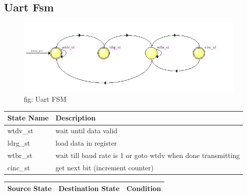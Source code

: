 \documentclass[12pt,a4 paper] {report}
\begin{document}
\newpage

\subsection{Uart Fsm}
\begin{figure}[h]
	\centering	
	\includegraphics[scale=0.5]{../png/Uart.png}
	\newline
	fig: Uart FSM\\
\end{figure}
\begin{center}
 \begin{tabular}{| p{4cm} | p{7cm} |}
	 \hline
	 \textbf{State Name} & \textbf{Description} \\
	 \hline
	 wtdv\_st & wait until data valid \\
	 \hline
	 ldrg\_st & load data in register \\
	 \hline
	 wtbr\_st & wait till baud rate is 1 or goto wtdv when done transmitting \\
	 \hline
	 cinc\_st & get next bit (increment counter) \\
	 \hline
 \end{tabular}
\end{center}
\begin{center}
	\begin{tabular}{| p{2cm} | p{2cm} | p{11cm} |}
		\hline
		Source State& Destination State & Condition \\
		\hline	
		
		
	\end{tabular}	
\end{center}

\newpage
\end{document}

